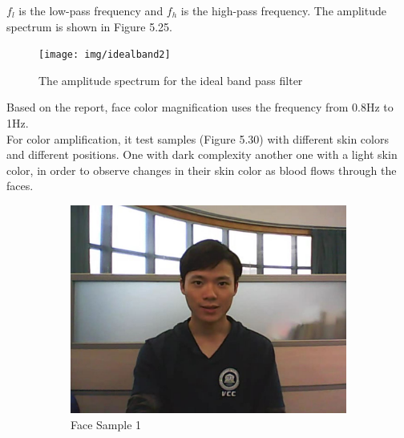 $f_{l}$ is the low-pass frequency and $f_{h}$ is the high-pass frequency. The amplitude spectrum is shown in Figure 5.25.
\begin{figure}[!htb]
	\centering
	\texttt{[image: img/idealband2]}
	\caption{The amplitude spectrum for the ideal band pass filter}
\end{figure}
Based on the report, face color magnification uses the frequency from 0.8Hz to 1Hz.\\

\newpage
For color amplification, it test samples (Figure 5.30) with different skin colors and different positions. One with dark complexity another one with a light skin color, in order to observe changes in their skin color as blood flows through the faces.\\

 \begin{figure}[!h]
\centering
\begin{subfigure}{.5\textwidth}
  \centering
  \includegraphics[scale=0.25]{img/eulerian/test/man}
  \caption{Face Sample 1}
  \label{fig:sub1}
\end{subfigure}%
\begin{subfigure}{.5\textwidth}
  \centering

\end{subfigure}
\end{figure}
